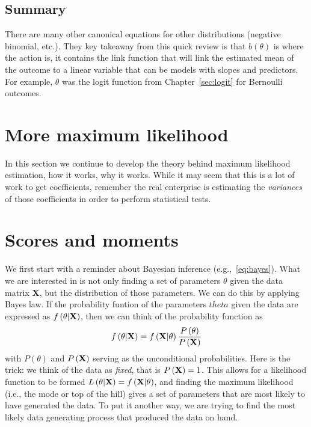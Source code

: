 \subsection{Summary}

There are many other canonical equations for other distributions (negative binomial, etc.). They key takeaway from this quick review is that $b(\theta)$ is where the action is, it contains the link function that will link the estimated mean of the outcome to a linear variable that can be models with slopes and predictors. For example, $\theta$ was the logit function from Chapter~\ref{sec:logit} for Bernoulli outcomes.

\section{More maximum likelihood}

In this section we continue to develop the theory behind maximum likelihood estimation, how it works, why it works. While it may seem that this is a lot of work to get coefficients, remember the real enterprise is estimating the {\it variances} of those coefficients in order to perform statistical tests.

\section{Scores and moments}

We first start with a reminder about Bayesian inference (e.g.,~\ref{eq:bayes}). What we are interested in is not only finding a set of parameters $\theta$ given the data matrix {\bf X}, but the distribution of those parameters. We can do this by applying Bayes law. If the probability funtion of the parameters $theta$ given the data are expressed as $f\left(\theta|{\bf X}\right)$, then we can think of the probability function as
\begin{equation}
f\left(\theta|{\bf X}\right)=f\left({\bf X}|\theta\right)\frac{P\left(\theta\right)}{P\left({\bf X}\right)}
\end{equation}
with $P\left(\theta\right)$ and $P\left({\bf X}\right)$ serving as the unconditional probabilities. Here is the trick: we think of the data as {\it fixed}, that is $P\left({\bf X}\right)=1$. This allows for a likelihood function to be formed $L\left(\theta|{\bf X}\right) = f\left({\bf X}|\theta\right)$, and finding the maximum likelihood (i.e., the mode or top of the hill) gives a set of parameters that are most likely to have generated the data. To put it another way, we are trying to find the most likely data generating process that produced the data on hand.

